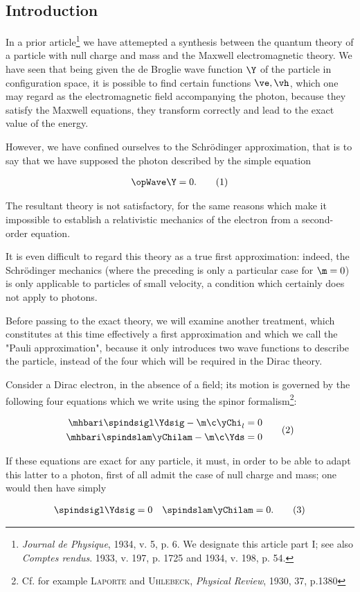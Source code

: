\documentclass{article}
\newcommand{\nequ}[2]{
\begin{align*}
#1
\tag{#2}
\end{align*}
}
\renewcommand{\it}[1]{\textit{#1}}
\renewcommand{\sc}[1]{\textsc{#1}}
\begin{document}
\begin{multicols}{2}
\section{Introduction}
In a prior article\footnote{\it{Journal de Physique}, 1934, v. 5, p. 6. We designate this article part I; see also \it{Comptes rendus}. 1933, v. 197, p. 1725 and 1934, v. 198, p. 54.} we have attemepted a synthesis between the quantum theory of a particle with null charge and mass and the Maxwell electromagnetic theory. We have seen that being given the de Broglie wave function $\Y$ of the particle in configuration space, it is possible to find certain functions $\ve, \vh$, which one may regard as the electromagnetic field accompanying the photon, because they satisfy the Maxwell equations, they transform correctly and lead to the exact value of the energy.

However, we have confined ourselves to the Schrödinger approximation, that is to say that we have supposed the photon described by the simple equation
\nequ{
\opWave\Y = 0.
}{1}

The resultant theory is not satisfactory, for the same reasons which make it impossible to establish a relativistic mechanics of the electron from a second-order equation.

It is even difficult to regard this theory as a true first approximation: indeed, the Schrödinger mechanics (where the preceding is only a particular case for $\m=0$) is only applicable to particles of small velocity, a condition which certainly does not apply to photons.

Before passing to the exact theory, we will examine another treatment, which constitutes at this time effectively a first approximation and which we call the "Pauli approximation", because it only introduces two wave functions to describe the particle, instead of the four which will be required in the Dirac theory.

Consider a Dirac electron, in the absence of a field; its motion is governed by the following four equations which we write using the spinor formalism\footnote{Cf. for example \sc{Laporte} and \sc{Uhlebeck}, \it{Physical Review}, 1930, 37, p.1380}:
\nequ{
\begin{split}
\mhbari\spindsigl\Ydsig - \m\c\yChi_l = 0 \\
\mhbari\spindslam\yChilam - \m\c\Yds = 0
\end{split}
}{2}

If these equations are exact for any particle, it must, in order to be able to adapt this latter to a photon, first of all admit the case of null charge and mass; one would then have simply
\nequ{
\spindsigl\Ydsig = 0\quad\spindslam\yChilam = 0.
}{3}


\end{multicols}
\end{document}
